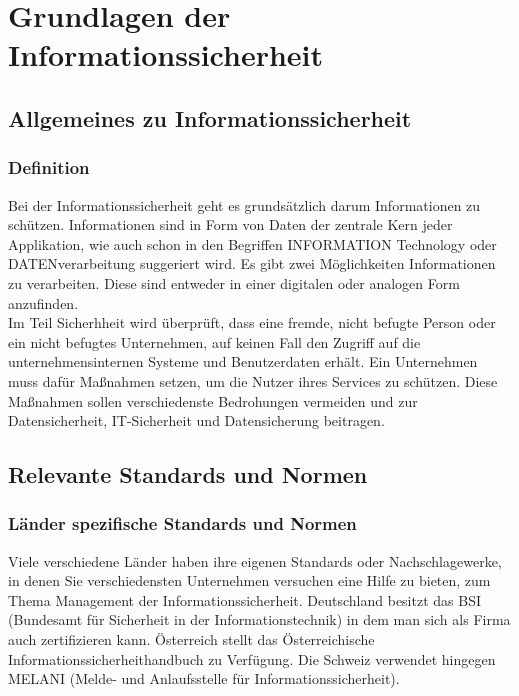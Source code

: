 \chapter{Grundlagen der Informationssicherheit}
\strahlhofer

\section{Allgemeines zu Informationssicherheit}
\subsection{Definition}
Bei der Informationssicherheit geht es grundsätzlich darum Informationen zu schützen. Informationen sind in Form von Daten der zentrale Kern jeder Applikation, wie auch schon in den Begriffen INFORMATION Technology oder DATENverarbeitung suggeriert wird. Es gibt zwei Möglichkeiten Informationen zu verarbeiten. Diese sind entweder in einer digitalen oder analogen Form anzufinden.
\\
Im Teil Sicherhheit wird überprüft, dass eine fremde, nicht befugte Person oder ein nicht befugtes Unternehmen, auf keinen Fall den Zugriff auf die unternehmensinternen Systeme und Benutzerdaten erhält. Ein Unternehmen muss dafür Maßnahmen setzen, um die Nutzer ihres Services zu schützen. Diese Maßnahmen sollen verschiedenste Bedrohungen vermeiden und zur Datensicherheit, IT-Sicherheit und Datensicherung beitragen.
\\

\section{Relevante Standards und Normen}

\subsection{Länder spezifische Standards und Normen}
Viele verschiedene Länder haben ihre eigenen Standards oder Nachschlagewerke, in denen Sie verschiedensten Unternehmen versuchen eine Hilfe zu bieten, zum Thema Management der Informationssicherheit.
Deutschland besitzt das BSI (Bundesamt für Sicherheit in der Informationstechnik) in dem man sich als Firma auch zertifizieren kann. Österreich stellt das Österreichische Informationssicherheithandbuch zu Verfügung. Die Schweiz verwendet hingegen MELANI (Melde- und Anlaufsstelle für Informationssicherheit).


